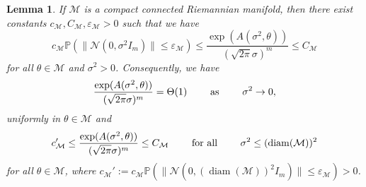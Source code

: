 \documentclass[preprint]{imsart}
\theoremstyle{plain}
\newtheorem{lemma}[theorem]{Lemma}
\theoremstyle{definition}
\newcommand{\Pbb}{\mathbb{P}}
\newcommand{\Ncal}{\mathcal{N}}
\newcommand{\Mcal}{\mathcal{M}}
\DeclareMathOperator{\diam}{diam}
\begin{document}
\begin{appendix}
\begin{lemma}\label{lem:normalizing-const}
    If $\Mcal$ is a compact connected Riemannian manifold, then there exist constants $c_{\Mcal},C_{\Mcal},\varepsilon_{\Mcal}>0$ such that we have
    \begin{equation*}
        c_{\Mcal}\Pbb(\|\Ncal(0,\sigma^2I_m)\|\le \varepsilon_{\Mcal})\le\frac{\exp(A(\sigma^2,\theta))}{(\sqrt{2\pi}\sigma)^m}\le C_{\Mcal}
    \end{equation*}
    for all $\theta\in\Mcal$ and $\sigma^2>0$.
    Consequently, we have
    \begin{equation*}
        \frac{\exp(A(\sigma^2,\theta))}{(\sqrt{2\pi}\sigma)^m}=\Theta(1)\qquad \textnormal{ as }\qquad \sigma^2\to 0,
    \end{equation*}
    uniformly in $\theta\in\Mcal$ and
    \begin{equation*}
        c_{\Mcal}'\le\frac{\exp(A(\sigma^2,\theta))}{(\sqrt{2\pi}\sigma)^m}\le C_{\Mcal} \qquad \textnormal{ for all }\qquad \sigma^2\le (\diam(\Mcal))^2
    \end{equation*}
    for all $\theta\in\Mcal$, where $c_{\Mcal}' := c_{\Mcal}\Pbb(\|\Ncal(0,(\diam(\Mcal))^2I_m)\|\le \varepsilon_{\Mcal})>0$.
\end{lemma}


\end{appendix}
\end{document}
